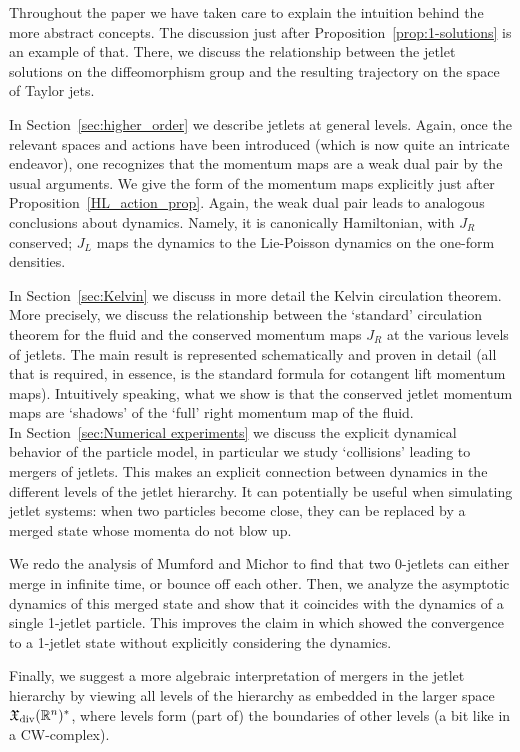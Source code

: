 \documentclass[12pt]{amsart}
\begin{document}
Throughout the paper we have taken care to explain the intuition behind the more abstract concepts. The discussion just after Proposition~\ref{prop:1-solutions} is an example of that. There, we discuss the relationship between the jetlet solutions on the diffeomorphism group and the resulting trajectory on the space of Taylor jets.

In Section~\ref{sec:higher_order} we describe jetlets at general levels. Again, once the relevant spaces and actions have been introduced (which is now quite an intricate endeavor), one recognizes that the momentum maps are a weak dual pair by the usual arguments. We give the form of the momentum maps explicitly just after Proposition~\ref{HL_action_prop}. Again, the weak dual pair leads to analogous conclusions about dynamics. Namely, it is canonically Hamiltonian, with $J_R$  conserved; $J_L$ maps the dynamics to the Lie-Poisson dynamics on the one-form densities.

In Section~\ref{sec:Kelvin} we discuss in more detail the Kelvin circulation theorem. More precisely, we discuss the relationship between the `standard' circulation theorem for the fluid and the conserved momentum maps $J_R$  at the various levels of jetlets. The main result is represented schematically and proven in detail (all that is required, in essence, is the standard formula for cotangent lift momentum maps). Intuitively speaking, what we show is that the conserved jetlet momentum maps are `shadows' of the `full' right momentum map of the fluid.\\

In Section~\ref{sec:Numerical experiments} we discuss the explicit dynamical behavior of the
particle model, in particular we study `collisions' leading to mergers of jetlets.
This makes an explicit connection between dynamics in the different
levels of the jetlet hierarchy. It can potentially be useful when
simulating jetlet systems: when two particles become close, they
can be replaced by a merged state whose momenta do not blow up.

We redo the analysis of Mumford and Michor to find that two 0-jetlets
can either merge in infinite time, or bounce off each other.
Then, we analyze the asymptotic dynamics of this merged state and show
that it coincides with the dynamics of a single 1-jetlet particle. This
improves the claim in \cite{CotterHolmJacobsMeier2014} which showed the
convergence to a 1-jetlet state without explicitly considering the dynamics.

Finally, we suggest a more algebraic interpretation of mergers in
the jetlet hierarchy by viewing all levels of the hierarchy as embedded
in the larger space $\mathfrak{X}_{\rm div}(\mathbb{R}^n)^*$, where levels form (part of) the
boundaries of other levels (a bit like in a CW-complex).
\end{document}
